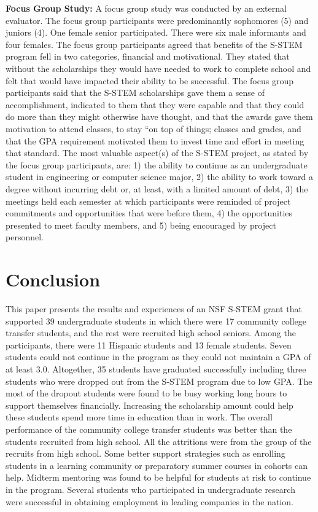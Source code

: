 \documentclass{article}
\begin{document}
\textbf{Focus Group Study:} A focus group study was conducted by an external evaluator. The focus group participants were predominantly sophomores (5) and juniors (4). One female senior participated. There were six male informants and four females. The focus group participants agreed that benefits of the S-STEM program fell in two categories, financial and motivational. They stated that without the scholarships they would have needed to work to complete school and felt that would have impacted their ability to be successful. The focus group participants said that the S-STEM scholarships gave them a sense of accomplishment, indicated to them that they were capable and that they could do more than they might otherwise have thought, and that the awards gave them motivation to attend classes, to stay “on top of things; classes and grades, and that the GPA requirement motivated them to invest time and effort in meeting that standard. The most valuable aspect(s) of the S-STEM project, as stated by the focus group participants, are: 1) the ability to continue as an undergraduate student in engineering or computer science major, 2) the ability to work toward a degree without incurring debt or, at least, with a limited amount of debt, 3) the meetings held each semester at which participants were reminded of project commitments and opportunities that were before them, 4) the opportunities presented to meet faculty members, and 5) being encouraged by project personnel. 

\section{Conclusion}
This paper presents the results and experiences of an NSF S-STEM grant that supported 39 undergraduate students in which there were 17 community college transfer students, and the rest were recruited high school seniors. Among the participants, there were 11 Hispanic students and 13 female students.  Seven students could not continue in the program as they could not maintain a GPA of at least 3.0. Altogether, 35 students have graduated successfully including three students who were dropped out from the S-STEM program due to low GPA. The most of the dropout students were found to be busy working long hours to support themselves financially. Increasing the scholarship amount could help these students spend more time in education than in work.  The overall performance of the community college transfer students was better than the students recruited from high school. All the attritions were from the group of the recruits from high school. Some better support strategies such as enrolling students in a learning community or preparatory summer courses in cohorts can help. Midterm mentoring was found to be helpful for students at risk to continue in the program. Several students who participated in undergraduate research were successful in obtaining employment in leading companies in the nation.
\end{document}
